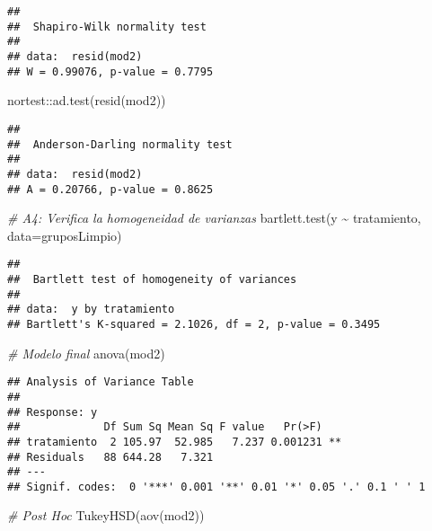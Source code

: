 \documentclass[
]{article}
\newenvironment{Shaded}{}{}
\newcommand{\AttributeTok}[1]{\textcolor[rgb]{0.49,0.56,0.16}{#1}}
\newcommand{\CommentTok}[1]{\textcolor[rgb]{0.38,0.63,0.69}{\textit{#1}}}
\newcommand{\FunctionTok}[1]{\textcolor[rgb]{0.02,0.16,0.49}{#1}}
\newcommand{\NormalTok}[1]{#1}
\newcommand{\SpecialCharTok}[1]{\textcolor[rgb]{0.25,0.44,0.63}{#1}}
\begin{document}
\begin{verbatim}
## 
##  Shapiro-Wilk normality test
## 
## data:  resid(mod2)
## W = 0.99076, p-value = 0.7795
\end{verbatim}

\begin{Shaded}
\begin{Highlighting}[]
\NormalTok{nortest}\SpecialCharTok{::}\FunctionTok{ad.test}\NormalTok{(}\FunctionTok{resid}\NormalTok{(mod2))}
\end{Highlighting}
\end{Shaded}

\begin{verbatim}
## 
##  Anderson-Darling normality test
## 
## data:  resid(mod2)
## A = 0.20766, p-value = 0.8625
\end{verbatim}

\begin{Shaded}
\begin{Highlighting}[]
\CommentTok{\# A4: Verifica la homogeneidad de varianzas}
\FunctionTok{bartlett.test}\NormalTok{(y }\SpecialCharTok{\textasciitilde{}}\NormalTok{ tratamiento, }\AttributeTok{data=}\NormalTok{gruposLimpio)}
\end{Highlighting}
\end{Shaded}

\begin{verbatim}
## 
##  Bartlett test of homogeneity of variances
## 
## data:  y by tratamiento
## Bartlett's K-squared = 2.1026, df = 2, p-value = 0.3495
\end{verbatim}

\begin{Shaded}
\begin{Highlighting}[]
\CommentTok{\# Modelo final }
\FunctionTok{anova}\NormalTok{(mod2)}
\end{Highlighting}
\end{Shaded}

\begin{verbatim}
## Analysis of Variance Table
## 
## Response: y
##             Df Sum Sq Mean Sq F value   Pr(>F)   
## tratamiento  2 105.97  52.985   7.237 0.001231 **
## Residuals   88 644.28   7.321                    
## ---
## Signif. codes:  0 '***' 0.001 '**' 0.01 '*' 0.05 '.' 0.1 ' ' 1
\end{verbatim}

\begin{Shaded}
\begin{Highlighting}[]
\CommentTok{\# Post Hoc}
\FunctionTok{TukeyHSD}\NormalTok{(}\FunctionTok{aov}\NormalTok{(mod2))}
\end{Highlighting}
\end{Shaded}
\end{document}
